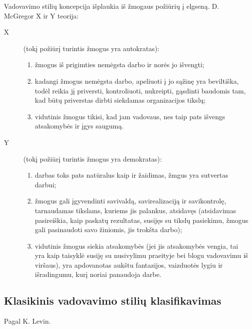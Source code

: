 Vadovavimo stilių koncepcija išplaukia iš žmogaus požiūrių į elgseną.
D. McGregor X ir Y teorija:
\begin{description}
  \item[X] (tokį požiūrį turintis žmogus yra autokratas):
    \begin{enumerate}
      \item žmogus iš prigimties nemėgsta darbo ir norės jo išvengti;
      \item kadangi žmogus nemėgsta darbo, apeliuoti į jo sąžinę yra
        beviltiška, todėl reikia jį priversti, kontroliuoti, nukreipti,
        gąsdinti baudomis tam, kad būtų priverstas dirbti siekdamas
        organizacijos tikslų;
      \item vidutinis žmogus tikisi, kad jam vadovaus, nes taip pats
        išvengs atsakomybės ir įgys saugumą.
    \end{enumerate}
  \item[Y] (tokį požiūrį turintis žmogus yra demokratas):
    \begin{enumerate}
      \item darbas toks pats natūralus kaip ir žaidimas, žmgus yra
        sutvertas darbui;
      \item žmogus gali įgyvendinti savivaldą, savirealizaciją ir
        savikontrolę, tarnaudamas tikslams, kuriems jis palankus,
        atsidavęs (atsidavimas pasireiškia, kaip paskatų rezultatas,
        susijęs su tikslų pasiekimu, žmogus gali pasinaudoti savo
        žiniomis, jis trokšta darbo);
      \item vidutinis žmogus siekia atsakomybės (jei jis atsakomybės
        vengia, tai yra kaip taisyklė susiję su nusivylimu praeityje
        bei blogu vadovavimu iš viršaus), yra apdovanotas aukštu
        fantazijos, vaizduotės lygiu ir išradingumu, kurį noriai
        panaudoja darbe.
    \end{enumerate}
\end{description}

\subsection{Klasikinis vadovavimo stilių klasifikavimas}

Pagal K. Levin.

